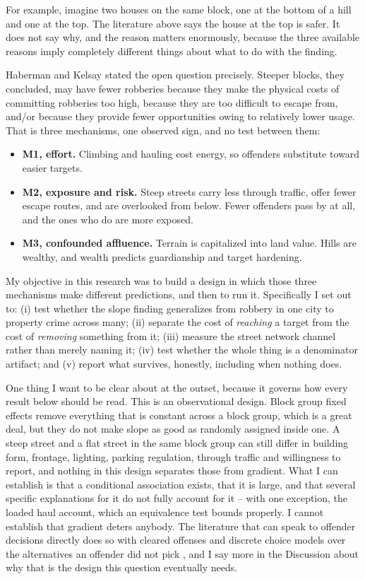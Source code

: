 \documentclass[12pt,letterpaper]{article}
\begin{document}
For example, imagine two houses on the same block, one at the bottom of a hill and
one at the top. The literature above says the house at the top is safer. It does not
say why, and the reason matters enormously, because the three available reasons imply
completely different things about what to do with the finding.

Haberman and Kelsay stated the open question precisely. Steeper blocks, they
concluded, may have fewer robberies because they make the physical costs of
committing robberies too high, because they are too difficult to escape from, and/or
because they provide fewer opportunities owing to relatively lower usage. That is
three mechanisms, one observed sign, and no test between them:

\begin{itemize}
\item \textbf{M1, effort.} Climbing and hauling cost energy, so offenders substitute
toward easier targets.
\item \textbf{M2, exposure and risk.} Steep streets carry less through traffic, offer
fewer escape routes, and are overlooked from below. Fewer offenders pass by at all,
and the ones who do are more exposed.
\item \textbf{M3, confounded affluence.} Terrain is capitalized into land value.
Hills are wealthy, and wealth predicts guardianship and target hardening.
\end{itemize}

My objective in this research was to build a design in which those three mechanisms
make different predictions, and then to run it. Specifically I set out to: (i) test
whether the slope finding generalizes from robbery in one city to property crime
across many; (ii) separate the cost of \emph{reaching} a target from the cost of
\emph{removing} something from it; (iii) measure the street network channel rather
than merely naming it; (iv) test whether the whole thing is a denominator artifact;
and (v) report what survives, honestly, including when nothing does.

One thing I want to be clear about at the outset, because it governs how every
result below should be read. This is an observational design. Block group fixed
effects remove everything that is constant across a block group, which is a great
deal, but they do not make slope as good as randomly assigned inside one. A steep
street and a flat street in the same block group can still differ in building form,
frontage, lighting, parking regulation, through traffic and willingness to report,
and nothing in this design separates those from gradient. What I can establish is
that a conditional association exists, that it is large, and that several specific
explanations for it do not fully account for it -- with one exception, the loaded
haul account, which an equivalence test bounds properly. I cannot establish that
gradient deters anybody.
The literature that can speak to offender decisions directly does so with cleared
offenses and discrete choice models over the alternatives an offender did not pick
\citep{frith2017,johnsonsummers2015,clare2009}, and I say more in the Discussion
about why that is the design this question eventually needs.
\end{document}
